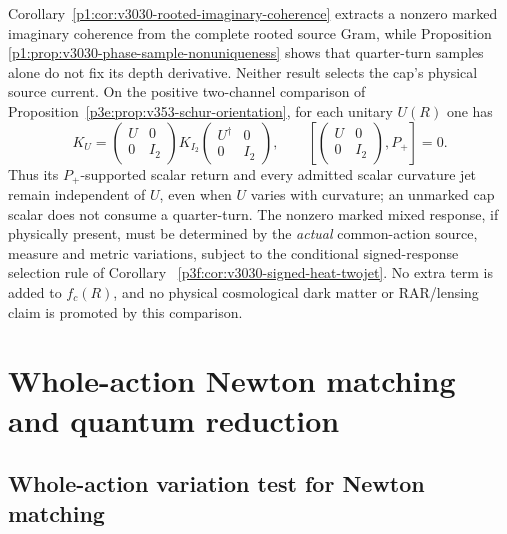 \documentclass[12pt,a4paper]{article}
\begin{document}
\begin{remark}
\label{p3e:rem:v3030-quarterturn-cap-firewall}
Corollary~\ref{p1:cor:v3030-rooted-imaginary-coherence}
extracts a nonzero marked imaginary coherence from the complete
rooted source Gram, while Proposition~
\ref{p1:prop:v3030-phase-sample-nonuniqueness} shows that
quarter-turn samples alone do not fix its depth derivative.
Neither result selects the cap's physical source current.
On the positive two-channel comparison of
Proposition~\ref{p3e:prop:v353-schur-orientation}, for each
unitary \(U(R)\) one has
\[
 K_U=\begin{pmatrix}U&0\\0&I_2\end{pmatrix}
      K_{I_2}
      \begin{pmatrix}U^\dagger&0\\0&I_2\end{pmatrix},
 \qquad
 \left[\begin{pmatrix}U&0\\0&I_2\end{pmatrix},P_+\right]=0.
\]
Thus its \(P_+\)-supported scalar return and every admitted scalar
curvature jet remain independent of \(U\), even when \(U\)
varies with curvature; an unmarked cap scalar does not consume a
quarter-turn.  The nonzero marked mixed response, if physically
present, must be determined by the \emph{actual} common-action
source, measure and metric variations, subject to the conditional
signed-response selection rule of Corollary~
\ref{p3f:cor:v3030-signed-heat-twojet}. No extra term is added to
\(f_c(R)\), and no physical cosmological dark matter or RAR/lensing
claim is promoted by this comparison.
\end{remark}

\section{Whole-action Newton matching and quantum reduction}
\label{paper3e:sec:v204-whole-action}
\subsection{Whole-action variation test for Newton matching}
\label{p3e:sec:v356-whole-action-variation}
\end{document}
